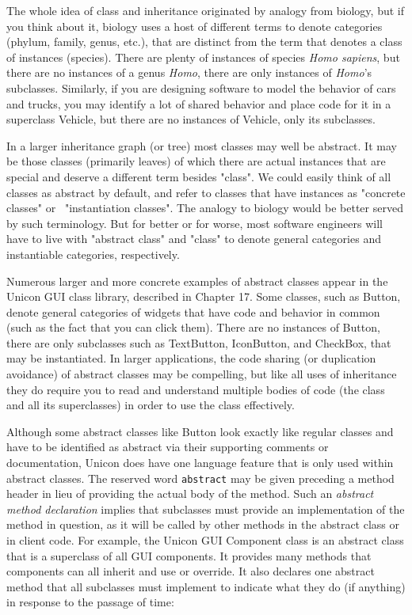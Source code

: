 The whole idea of class and inheritance originated by analogy from
biology, but if you think about it, biology uses a host of different
terms to denote categories (phylum, family, genus, etc.), that are
distinct from the term that denotes a class of instances (species).
There are plenty of instances of species \textit{Homo sapiens}, but
there are no instances of a genus \textit{Homo}, there are only
instances of \textit{Homo}'s subclasses. Similarly, if
you are designing software to model the behavior of cars and trucks,
you may identify a lot of shared behavior and place code for it in a
superclass Vehicle, but there are no instances of Vehicle, only its
subclasses.

In a larger inheritance graph (or tree) most classes may well be
abstract. It may be those classes (primarily leaves) of which there are
actual instances that are special and deserve a different term besides
"class". We could easily think of all
classes as abstract by default, and refer to classes that have
instances as "concrete classes" or
\ "instantiation classes". The analogy to
biology would be better served by such terminology. But for better or
for worse, most software engineers will have to live with
"abstract class" and
"class" to denote general categories and
instantiable categories, respectively.

Numerous larger and more concrete examples of abstract classes appear in
the Unicon GUI class library, described in Chapter 17. Some classes,
such as Button, denote general categories of widgets that have code and
behavior in common (such as the fact that you can click them). There
are no instances of Button, there are only subclasses such as
\textsf{TextButton}, \textsf{IconButton}, and \textsf{CheckBox}, that
may be instantiated. In larger applications, the code sharing (or
duplication avoidance) of abstract classes may be compelling, but like
all uses of inheritance they do require you to read and understand
multiple bodies of code (the class and all its superclasses) in order
to use the class effectively.

Although some abstract classes like Button look exactly like regular
classes and have to be identified as abstract via their supporting
comments or documentation, Unicon does have one language feature that is
only used within abstract classes. The reserved word
\texttt{abstract} may be given preceding a method header in lieu of
providing the actual body of the method. Such an \textit{abstract
method declaration} implies that subclasses must provide an
implementation of the method in question, as it will be called by
other methods in the abstract class or in client code.
For example, the Unicon GUI Component class is an abstract class
that is a superclass of all GUI components. It provides many methods
that components can all inherit and use or override. It also declares
one abstract method that all subclasses must implement to indicate
what they do (if anything) in response to the passage of time:

